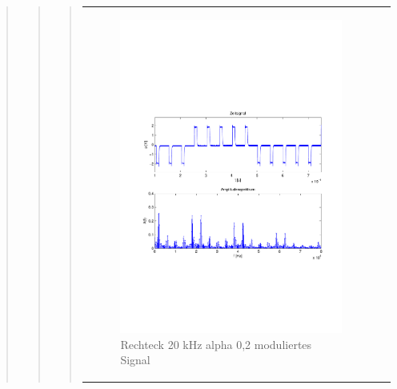 \begin{quote}
\begin{quote}
\begin{quote}
\begin{center}
\begin{tabular}{ll}
            \hspace{-5cm}
                \begin{minipage}{0.6\textwidth}
                    \begin{figure}[H]
                        \includegraphics[scale=0.55, trim = 16mm 70mm 16mm 85mm, clip]{Bilder/shaperec20_02abget_zeit}
                          \caption{Rechteck 20 kHz alpha 0,2 moduliertes Signal}
		                  \label{fig:shaperec20_02zeit}
                    \end{figure}
                \end{minipage}
                

\end{tabular}
\end{center}
\end{quote}
\end{quote}
\end{quote}
